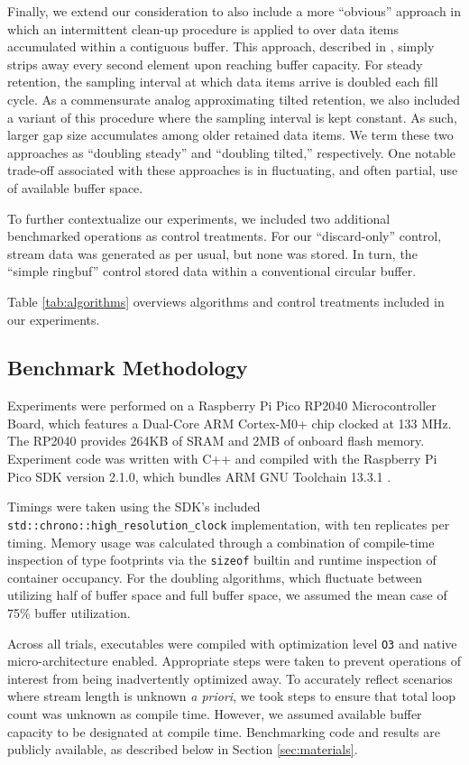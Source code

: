 Finally, we extend our consideration to also include a more ``obvious'' approach in which an intermittent clean-up procedure is applied to over data items accumulated within a contiguous buffer.
This approach, described in \citet{gunther2014compressing}, simply strips away every second element upon reaching buffer capacity.
For steady retention, the sampling interval at which data items arrive is doubled each fill cycle.
As a commensurate analog approximating tilted retention, we  also included a variant of this procedure where the sampling interval is kept constant.
As such, larger gap size accumulates among older retained data items.
We term these two approaches as ``doubling steady'' and ``doubling tilted,'' respectively.
One notable trade-off associated with these approaches is in fluctuating, and often partial, use of available buffer space.

To further contextualize our experiments, we included two additional benchmarked operations as control treatments.
For our ``discard-only'' control, stream data was generated as per usual, but none was stored.
In turn, the ``simple ringbuf'' control stored data within a conventional circular buffer.

Table \ref{tab:algorithms} overviews algorithms and control treatments included in our experiments.

\subsection{Benchmark Methodology}

Experiments were performed on a Raspberry Pi Pico RP2040 Microcontroller Board, which features a Dual-Core ARM Cortex-M0+ chip clocked at 133 MHz.
The RP2040 provides 264KB of SRAM and 2MB of onboard flash memory.
Experiment code was written with C++ and compiled with the Raspberry Pi Pico SDK version 2.1.0, which bundles ARM GNU Toolchain 13.3.1 \citep{raspberrypipico2024}.

Timings were taken using the SDK's included \texttt{std::chrono::high\_resolution\_clock} implementation, with ten replicates per timing.
Memory usage was calculated through a combination of compile-time inspection of type footprints via the \texttt{sizeof} builtin and runtime inspection of container occupancy.
For the doubling algorithms, which fluctuate between utilizing half of buffer space and full buffer space, we assumed the mean case of 75\% buffer utilization.

Across all trials, executables were compiled with optimization level \texttt{O3} and native micro-architecture enabled.
Appropriate steps were taken to prevent operations of interest from being inadvertently optimized away.
To accurately reflect scenarios where stream length is unknown \textit{a priori}, we took steps to ensure that total loop count was unknown as compile time.
However, we assumed available buffer capacity to be designated at compile time.
Benchmarking code and results are publicly available, as described below in Section \ref{sec:materials}.

